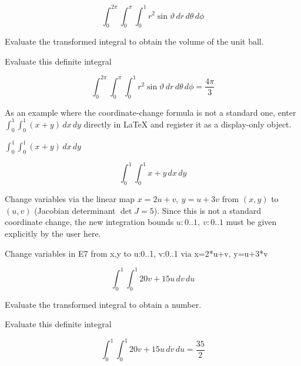 \documentclass[dvipdfmx]{article}
\begin{document}
\begin{equation}
  \int_{0}^{2\pi} \int_{0}^{\pi} \int_{0}^{1} r^2 \sin \vartheta \, dr \, d\theta \, d\phi
  \label{eq:E5}
\end{equation}

Evaluate the transformed integral to obtain the volume of the unit ball.

Evaluate this definite integral

\begin{equation}
  \int_{0}^{2\pi} \int_{0}^{\pi} \int_{0}^{1} r^2 \sin \vartheta \, dr \, d\theta \, d\phi = \frac{4 \pi}{3}
  \label{eq:E6}
\end{equation}

As an example where the coordinate-change formula is not a standard one, enter $\int_0^1\int_0^1(x+y)\,dx\,dy$ directly in LaTeX and register it as a display-only object.

$\int_{0}^{1} \int_{0}^{1} (x+y) \, dx \, dy$

\begin{equation}
  \int_{0}^{1} \int_{0}^{1} x+y \, dx \, dy
  \label{eq:E7}
\end{equation}

Change variables via the linear map $x=2u+v,\ y=u+3v$ from $(x,y)$ to $(u,v)$ (Jacobian determinant $\det J=5$). Since this is not a standard coordinate change, the new integration bounds $u:0..1,\ v:0..1$ must be given explicitly by the user here.

Change variables in E7 from x,y to u:0..1, v:0..1 via x=2*u+v, y=u+3*v

\begin{equation}
  \int_{0}^{1} \int_{0}^{1} 20 v+15 u \, dv \, du
  \label{eq:E8}
\end{equation}

Evaluate the transformed integral to obtain a number.

Evaluate this definite integral

\begin{equation}
  \int_{0}^{1} \int_{0}^{1} 20 v+15 u \, dv \, du = \frac{35}{2}
  \label{eq:E9}
\end{equation}
\end{document}
